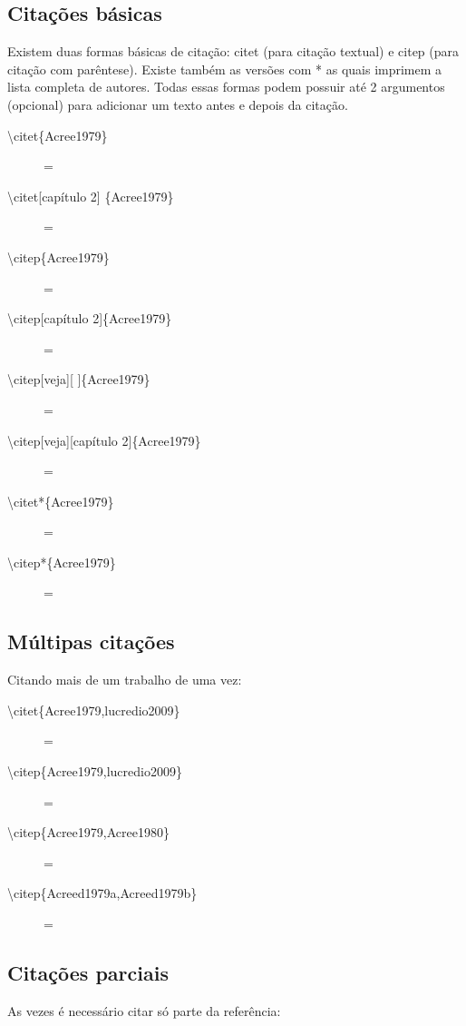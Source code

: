 \subsection{Citações básicas}
Existem duas formas básicas de citação: citet (para citação textual) e citep (para citação com parêntese). Existe também as versões com * as quais imprimem a lista completa de autores. Todas essas formas podem possuir até 2 argumentos (opcional) para adicionar um texto antes e depois da citação. 
\begin{description}
   \item [\textbackslash citet\{Acree1979\}]= \citet{Acree1979}
   \item [\textbackslash citet{[}capítulo 2{]} \{Acree1979\}]= \citet[capítulo 2]{Acree1979}
   \item [\textbackslash citep\{Acree1979\}]= \citep{Acree1979}
   \item [\textbackslash citep{[}capítulo 2{]}\{Acree1979\}]= \citep[capítulo 2]{Acree1979}
   \item [\textbackslash citep{[}veja{]}{[} {]}\{Acree1979\}]= \citep[veja][]{Acree1979}
   \item [\textbackslash citep{[}veja{]}{[}capítulo 2{]}\{Acree1979\}]= \citep[veja][capítulo 2]{Acree1979}
   \item [\textbackslash citet*\{Acree1979\}]= \citet*{Acree1979}
   \item [\textbackslash citep*\{Acree1979\}]= \citep*{Acree1979}
\end{description}

\subsection{Múltipas citações}
Citando mais de um trabalho de uma vez:
\begin{description}
   \item [\textbackslash citet\{Acree1979,lucredio2009\}]= \citet{Acree1979,lucredio2009}
   \item [\textbackslash citep\{Acree1979,lucredio2009\}]= \citep{Acree1979,lucredio2009}
   \item [\textbackslash citep\{Acree1979,Acree1980\}]= \citep{Acree1979,Acree1980}
   \item [\textbackslash citep\{Acreed1979a,Acreed1979b\}]= \citep{Acreed1979a,Acreed1979b}
\end{description}

\subsection{Citações parciais}
As vezes é necessário citar só parte da referência:

